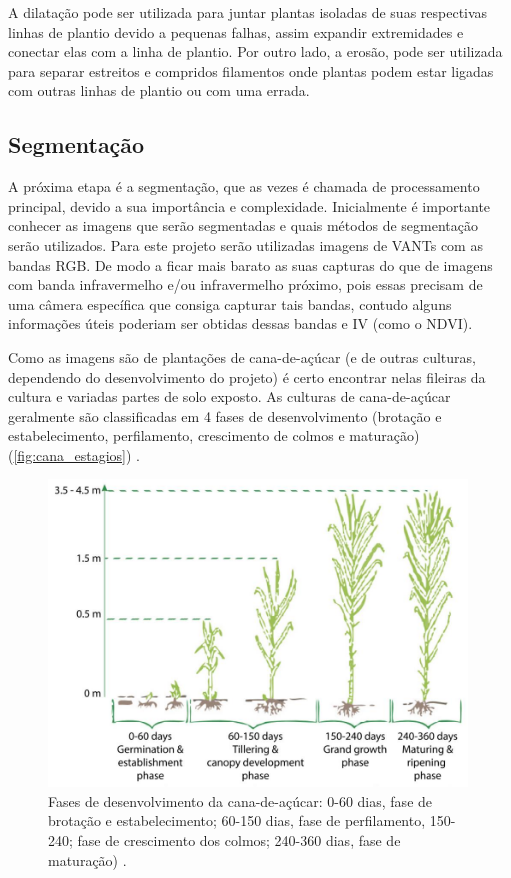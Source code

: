 \documentclass[12pt, a4paper, english, brazil]{article}
\begin{document}
A dilatação pode ser utilizada para juntar plantas isoladas de suas respectivas linhas de plantio devido a pequenas falhas, assim expandir extremidades e conectar elas com a linha de plantio. Por outro lado, a erosão, pode ser utilizada para separar estreitos e compridos filamentos onde plantas podem estar ligadas com outras linhas de plantio ou com uma errada.

\subsection{Segmentação}

A próxima etapa é a segmentação, que as vezes é chamada de processamento principal, devido a sua importância e complexidade. Inicialmente é importante conhecer as imagens que serão segmentadas e quais métodos de segmentação serão utilizados. Para este projeto serão utilizadas imagens de VANTs com as bandas RGB. De modo a ficar mais barato as suas capturas do que de imagens com banda infravermelho e/ou infravermelho próximo, pois essas precisam de uma câmera específica que consiga capturar tais bandas, contudo alguns informações úteis poderiam ser obtidas dessas bandas e IV (como o NDVI).

Como as imagens são de plantações de cana-de-açúcar (e de outras culturas, dependendo do desenvolvimento do projeto) é certo encontrar nelas fileiras da cultura e variadas partes de solo exposto. As culturas de cana-de-açúcar geralmente são classificadas em 4 fases de desenvolvimento (brotação e estabelecimento, perfilamento, crescimento de colmos e maturação) (\autoref{fig:cana_estagios}) \cite{Lu_Zhou_2019}.

\begin{figure}[htbp]
    \centering
    \includegraphics[width=0.99\textwidth]{img/cana_estagios.jpg}
    \caption{Fases de desenvolvimento da cana-de-açúcar: 0-60 dias, fase de brotação e estabelecimento; 60-150 dias, fase de perfilamento, 150-240; fase de crescimento dos colmos; 240-360 dias, fase de maturação) \cite{Molijn_2019}.}
    \label{fig:cana_estagios}
\end{figure}
\end{document}
